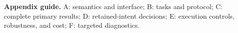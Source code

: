\noindent\textbf{Appendix guide.} A: semantics and interface; B: tasks and protocol;
C: complete primary results; D: retained-intent decisions;
E: execution controls, robustness, and cost; F: targeted diagnostics.






